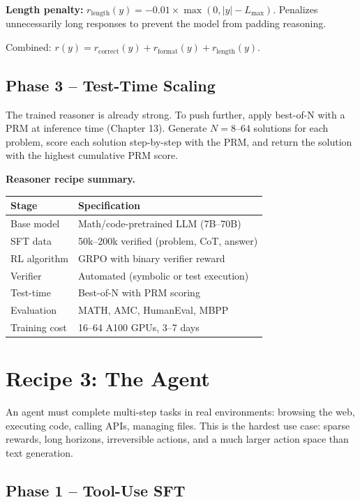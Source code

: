 \begin{chapterenv}
\begin{infobox}
\textbf{Length penalty:} $r_{\text{length}}(y) = -0.01 \times \max(0, |y| - L_{\max})$. Penalizes unnecessarily long responses to prevent the model from padding reasoning.

Combined: $r(y) = r_{\text{correct}}(y) + r_{\text{format}}(y) + r_{\text{length}}(y)$.
\end{infobox}

\subsection{Phase 3 -- Test-Time Scaling}

The trained reasoner is already strong. To push further, apply best-of-N with a PRM at inference time (Chapter 13). Generate $N = 8$--$64$ solutions for each problem, score each solution step-by-step with the PRM, and return the solution with the highest cumulative PRM score.

\begin{infobox}
\textbf{Reasoner recipe summary.}

\begin{tabular}{ll}
\toprule
Stage & Specification \\
\midrule
Base model & Math/code-pretrained LLM (7B--70B) \\
SFT data & 50k--200k verified (problem, CoT, answer) \\
RL algorithm & GRPO with binary verifier reward \\
Verifier & Automated (symbolic or test execution) \\
Test-time & Best-of-N with PRM scoring \\
Evaluation & MATH, AMC, HumanEval, MBPP \\
Training cost & 16--64 A100 GPUs, 3--7 days \\
\bottomrule
\end{tabular}
\end{infobox}

\section{Recipe 3: The Agent}

An agent must complete multi-step tasks in real environments: browsing the web, executing code, calling APIs, managing files. This is the hardest use case: sparse rewards, long horizons, irreversible actions, and a much larger action space than text generation.

\subsection{Phase 1 -- Tool-Use SFT}


\end{chapterenv}
